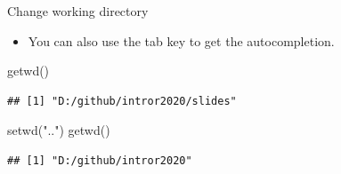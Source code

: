 \documentclass[
  10pt,
  ignorenonframetext,
]{beamer}
\newenvironment{Shaded}{\begin{snugshade}}{\end{snugshade}}
\newcommand{\KeywordTok}[1]{\textcolor[rgb]{0.94,0.87,0.69}{#1}}
\newcommand{\NormalTok}[1]{\textcolor[rgb]{0.80,0.80,0.80}{#1}}
\newcommand{\StringTok}[1]{\textcolor[rgb]{0.80,0.58,0.58}{#1}}
\providecommand{\tightlist}{%
  \setlength{\itemsep}{0pt}\setlength{\parskip}{0pt}}
\begin{document}
\begin{frame}[fragile]{Change working directory}
\protect\hypertarget{change-working-directory}{}

\begin{itemize}
\tightlist
\item
  You can also use the tab key to get the autocompletion.
\end{itemize}

\begin{Shaded}
\begin{Highlighting}[]
\KeywordTok{getwd}\NormalTok{()}
\end{Highlighting}
\end{Shaded}

\begin{verbatim}
## [1] "D:/github/intror2020/slides"
\end{verbatim}

\begin{Shaded}
\begin{Highlighting}[]
\KeywordTok{setwd}\NormalTok{(}\StringTok{".."}\NormalTok{)}
\KeywordTok{getwd}\NormalTok{()}
\end{Highlighting}
\end{Shaded}

\begin{verbatim}
## [1] "D:/github/intror2020"
\end{verbatim}

\end{frame}
\end{document}
